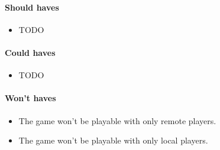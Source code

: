 \paragraph{Should haves}
\begin{itemize}
	\item TODO
\end{itemize}

\paragraph{Could haves}
\begin{itemize}
	\item TODO
\end{itemize}

\paragraph{Won't haves}
\begin{itemize}
	\item The game won't be playable with only remote players.
	\item The game won't be playable with only local players.
\end{itemize}